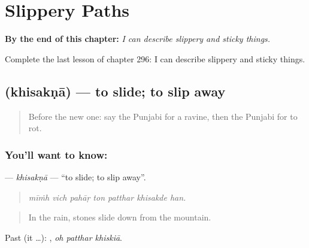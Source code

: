 
\chapter{Slippery Paths}
\label{ch:pa-a2-slippery-paths}

\begin{chapteropening}
\textbf{By the end of this chapter:} \emph{I can describe slippery and sticky things.}

Complete the last lesson of chapter 296: I can describe slippery and sticky things.
\end{chapteropening}

\section[\texorpdfstring{\pa{ਖਿਸਕਣਾ} (khisakṇā)}{ਖਿਸਕਣਾ (khisakṇā)}]{ (khisakṇā) — to slide; to slip away}

\label{lesson:PA-C296-khisakna}



\begin{quote}
Before the new one: say the Punjabi for a ravine, then the Punjabi for to rot.
\end{quote}

\subsection*{You'll want to know: }
\textbf{} — \emph{khisakṇā} — \textquotedblleft{}to slide; to slip away\textquotedblright{}.

\begin{quote}
      
\end{quote}

\begin{quote}
\emph{mīṁh vich pahāṛ ton patthar khisakde han.}
\end{quote}

\begin{quote}
In the rain, stones slide down from the mountain.
\end{quote}

Past (it …):   , \emph{oh patthar khiskiā}.

